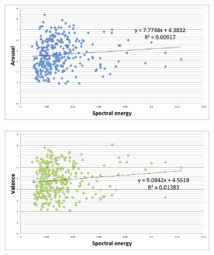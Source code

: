 \begin{figure}
		\vspace{-60pt}
       
      \centering
        \begin{subfigure}[b]{0.48\textwidth}
                \includegraphics[width=\textwidth]{Figures/spectralenergy-arousal}
			   \vspace{20pt}
        \end{subfigure}
        \begin{subfigure}[b]{0.48\textwidth}
                \includegraphics[width=\textwidth]{Figures/spectralenergy-valence}
                  \vspace{20pt}
        \end{subfigure}        
        

\end{figure}
